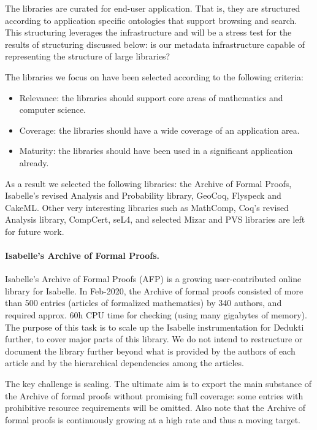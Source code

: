 The libraries are curated for end-user application. That is, they are
structured according to application specific ontologies that support
browsing and search. This structuring leverages the infrastructure
and will be a stress test for the results of structuring discussed
below: is our metadata infrastructure capable of representing the
structure of large libraries?

The libraries we focus on have been selected according to the
following criteria:
\begin{itemize}
\item Relevance: the libraries should support core areas of mathematics
  and computer science.
\item Coverage: the libraries should have a wide coverage of an
  application area.
\item Maturity: the libraries should have been used in a significant
  application already.
\end{itemize}

As a result we selected the following libraries: the Archive of Formal
Proofs, Isabelle's revised Analysis and Probability library, GeoCoq,
Flyspeck and CakeML.  Other very interesting libraries such as
MathComp, Coq's revised Analysis library, CompCert, seL4, and selected
Mizar and PVS libraries are left for future work.

\paragraph*{Isabelle's Archive of Formal Proofs.}
Isabelle's Archive of Formal Proofs (AFP) \cite{isabelle-afp} is a
growing user-contributed online library for Isabelle. In Feb-2020, the
Archive of formal proofs consisted of more than 500 entries (articles of formalized
mathematics) by 340 authors, and required approx. 60h CPU time for
checking (using many gigabytes of memory).  The purpose of this task
is to scale up the Isabelle instrumentation for Dedukti further, to
cover major parts of this library. We do not intend to restructure or
document the library further beyond what is provided by the authors of
each article and by the hierarchical dependencies among the articles.

The key challenge is scaling. The ultimate aim is to export the main
substance of the Archive of formal proofs without promising full coverage: some entries
with prohibitive resource requirements will be omitted. Also note that
the Archive of formal proofs is continuously growing at a high rate and thus a moving
target.

